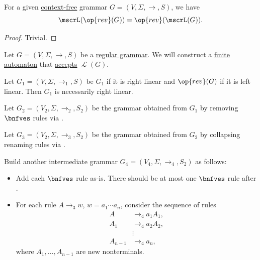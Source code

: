 \begin{proposition}\label{thm:reverse_grammar_language}
  For a given \hyperref[def:chomsky_hierarchy/context_free]{context-free} grammar \( G = (V, \Sigma, \to, S) \), we have
  \begin{equation*}
    \mscrL(\op{rev}(G)) = \op{rev}(\mscrL(G)).
  \end{equation*}
\end{proposition}
\begin{proof}
  Trivial.
\end{proof}

\begin{algorithm}\label{alg:regular_grammar_to_automaton}
  Let \( G = (V, \Sigma, \to, S) \) be a \hyperref[def:chomsky_hierarchy/regular]{regular grammar}. We will construct a \hyperref[def:finite_automaton]{finite automaton} that \hyperref[def:finite_automaton/language]{accepts} \( \mscrL(G) \).

  \begin{thmenum}
     Let \( G_1 = (V, \Sigma, \to_1, S) \) be \( G_1 \) if it is right linear and \( \op{rev}(G) \) if it is left linear. Then \( G_1 \) is necessarily right linear.

     Let \( G_2 = (V_2, \Sigma, \to_2, S_2) \) be the grammar obtained from \( G_1 \) by removing \( \bnfves \) rules via .

     Let \( G_3 = (V_2, \Sigma, \to_3, S_2) \) be the grammar obtained from \( G_2 \) by collapsing renaming rules via .

     Build another intermediate grammar \( G_4 = (V_4, \Sigma, \to_4, S_2) \) as follows:
    \begin{itemize}
      \item Add each \( \bnfves \) rule as-is. There should be at most one \( \bnfves \) rule after .
      \item For each rule \( A \to_3 w \), \( w = a_1 \cdots a_n \), consider the sequence of rules
      \begin{align*}
        A       &\to_4 a_1 A_1, \\
        A_1     &\to_4 a_2 A_2, \\
                &\vdots \\
        A_{n-1} &\to_4 a_n,
      \end{align*}
      where \( A_1, \ldots, A_{n-1} \) are new nonterminals.


\end{itemize}
\end{thmenum}
\end{algorithm}
